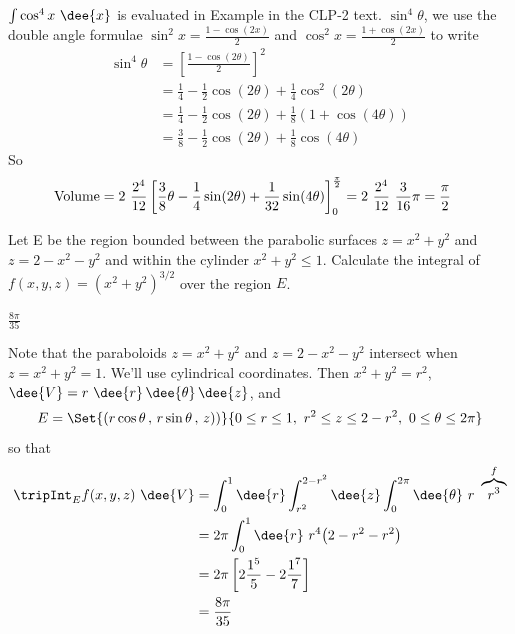 \begin{solution}
{$\int \cos^4 x\ \dee{x}$ is evaluated in Example  
in the CLP-2 text.} 
$\sin^4\theta$, we use the double angle formulae
$\sin^2 x= \frac{1-\cos(2x)}{2}$ and $\cos^2 x= \frac{1+\cos(2x)}{2}$
to write
\begin{align*}
  \sin^4\theta &= \left[ \frac{1-\cos(2\theta)}{2} \right]^2 \\
   &= \frac{1}{4} - \frac{1}{2} \cos(2\theta) + \frac{1}{4}\cos^2(2\theta)\\
  &= \frac{1}{4} - \frac{1}{2} \cos(2\theta) + \frac{1}{8}\left(1 + \cos(4\theta) \right)\\
  &= \frac{3}{8} - \frac{1}{2} \cos(2\theta) + \frac{1}{8}\cos(4\theta)
\end{align*}
So
\begin{align*}
\text{Volume} 
&= 2\ \frac{2^4}{12} \left[
   \frac{3}{8}\theta - \frac{1}{4} \sin(2\theta) + \frac{1}{32}\sin(4\theta)
                                       \right]_0^{\pi\over 2}
= 2\ \frac{2^4}{12}\ \frac{3}{16}\pi
=\frac{\pi}{2}
\end{align*}
\end{solution}

\begin{question}[M200 2008A] %
Let E be the region bounded between the parabolic surfaces 
$z = x^2 + y^2$ and $z = 2 - x^2 - y^2$ and within the cylinder 
$x^2 + y^2 \le 1$.  Calculate the integral of $f(x,y,z) = {(x^2 + y^2)}^{3/2}$ over the region $E$.
\end{question}

%

\begin{answer}
$\frac{8\pi}{35}$
\end{answer}

\begin{solution}
Note that the paraboloids $z=x^2+y^2$ and $z=2-x^2-y^2$
intersect when $z=x^2+y^2=1$.
We'll use cylindrical coordinates. Then $x^2+y^2=r^2$, 
$\dee{V}=r \ \dee{r}\,\dee{\theta}\,\dee{z}$, and
\begin{equation*}
E=\Set{(r\cos\theta\,,\,r\sin\theta\,,\,z))}{0\le r\le 1,\ 
                    r^2\le z\le 2-r^2,\ 0\le\theta\le 2\pi}
\end{equation*}
so that
\begin{align*}
\tripInt_E f(x,y,z)\ \dee{V}
&=\int_0^1\dee{r}\int_{r^2}^{2-r^2}\dee{z}\int_0^{2\pi}\dee{\theta}\ 
        r\ \overbrace{r^3}^{f} \\
&=2\pi \int_0^1\dee{r}\ r^4\big(2-r^2-r^2\big) \\
&=2\pi \left[2\frac{1^5}{5}-2\frac{1^7}{7}\right] \\
&=\frac{8\pi}{35}
\end{align*}
\end{solution}

